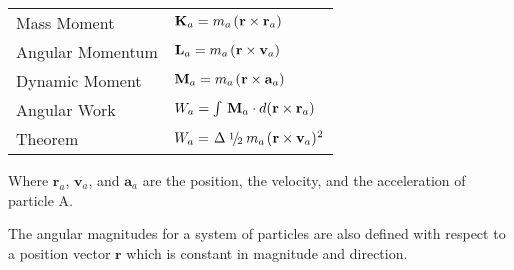 \documentclass[10pt]{article}
\newcommand{\mM}{m}
\newcommand{\mW}{W}
\newcommand{\ra}{_a}
\newcommand{\vR}{\mathbf{r}}
\newcommand{\vV}{\mathbf{v}}
\newcommand{\vA}{\mathbf{a}}
\newcommand{\vK}{\mathbf{K}}
\newcommand{\vL}{\mathbf{L}}
\newcommand{\vM}{\mathbf{M}}
\newcommand{\med}{\raise.5ex\hbox{$\scriptstyle 1$}\kern-.15em/\kern-.15em\lower.25ex\hbox{$\scriptstyle 2$}}
\begin{document}
\begin{center}
\begin{tabular}{ll}
Mass Moment & \hspace{+1.20em} $\vK\ra = \mM\ra \hspace{+0.12em} (\hspace{+0.03em} \vR \times \vR\ra)$ \vspace{+0.90em} \\
Angular Momentum & \hspace{+1.20em} $\vL\ra = \mM\ra \hspace{+0.12em} (\hspace{+0.03em} \vR \times \vV\ra)$ \vspace{+0.90em} \\
Dynamic Moment & \hspace{+1.20em} $\vM\ra = \mM\ra \hspace{+0.12em} (\hspace{+0.03em} \vR \times \vA\ra)$ \vspace{+0.90em} \\
Angular Work & \hspace{+1.20em} $\mW\ra = \int \hspace{+0.18em} \vM\ra \cdot d(\hspace{+0.03em} \vR \times \vR\ra)$ \vspace{+0.90em} \\
Theorem & \hspace{+1.20em} $\mW\ra = \hspace{+0.09em} \Delta \hspace{+0.24em} \med \hspace{+0.24em} \mM\ra \hspace{+0.12em} (\hspace{+0.03em} \vR \times \vV\ra)^{\hspace{+0.03em} 2}$
\end{tabular}
\end{center}

\vspace{+0.60em}

\par Where $\vR\ra$, $\vV\ra$, and $\vA\ra$ are the position, the velocity, and the acceleration of particle A.
\medskip
\par The angular magnitudes for a system of particles are also defined with respect to a position vector $\vR$ which is constant in magnitude and direction.
\end{document}
